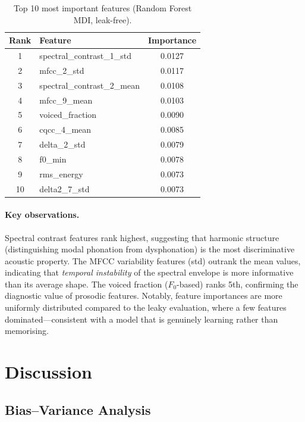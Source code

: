 \documentclass[11pt,a4paper]{article}
\begin{document}
\begin{table}[H]
\centering
\caption{Top 10 most important features (Random Forest MDI, leak-free).}
\label{tab:feature_imp}
\begin{tabular}{clc}
\toprule
\textbf{Rank} & \textbf{Feature} & \textbf{Importance} \\
\midrule
1  & spectral\_contrast\_1\_std & 0.0127 \\
2  & mfcc\_2\_std              & 0.0117 \\
3  & spectral\_contrast\_2\_mean & 0.0108 \\
4  & mfcc\_9\_mean             & 0.0103 \\
5  & voiced\_fraction          & 0.0090 \\
6  & cqcc\_4\_mean             & 0.0085 \\
7  & delta\_2\_std             & 0.0079 \\
8  & f0\_min                   & 0.0078 \\
9  & rms\_energy               & 0.0073 \\
10 & delta2\_7\_std            & 0.0073 \\
\bottomrule
\end{tabular}
\end{table}

\paragraph{Key observations.}
Spectral contrast features rank highest, suggesting that harmonic
structure (distinguishing modal phonation from dysphonation) is the
most discriminative acoustic property. The MFCC variability features
(std) outrank the mean values, indicating that \textit{temporal
instability} of the spectral envelope is more informative than its
average shape. The voiced fraction ($F_0$-based) ranks 5th,
confirming the diagnostic value of prosodic features. Notably,
feature importances are more uniformly distributed compared to the
leaky evaluation, where a few features dominated---consistent with
a model that is genuinely learning rather than memorising.

\section{Discussion}
\label{sec:discussion}

\subsection{Bias--Variance Analysis}
\end{document}
